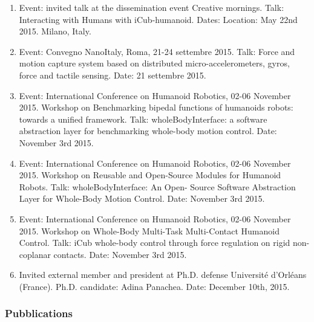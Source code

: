 \begin{enumerate}
\item Event: invited talk at the dissemination event Creative mornings. Talk: Interacting with Humans with iCub-humanoid. Dates: Location: May 22nd 2015. Milano, Italy.
\item  Event: Convegno NanoItaly, Roma, 21-24 settembre 2015. Talk: Force and motion capture system
based on distributed micro-accelerometers, gyros, force and tactile sensing. Date: 21 settembre 2015.
\item  Event: International Conference on Humanoid Robotics, 02-06 November 2015. Workshop on Benchmarking bipedal functions of humanoids robots: towards a unified framework. Talk: wholeBodyInterface: a software abstraction layer for benchmarking whole-body motion control. Date: November 3rd 2015.
\item  Event: International Conference on Humanoid Robotics, 02-06 November 2015. Workshop on Reusable and Open-Source Modules for Humanoid Robots. Talk: wholeBodyInterface: An Open- Source Software Abstraction Layer for Whole-Body Motion Control. Date: November 3rd 2015.
\item  Event: International Conference on Humanoid Robotics, 02-06 November 2015. Workshop on Whole-Body Multi-Task Multi-Contact Humanoid Control. Talk: iCub whole-body control through force regulation on rigid non-coplanar contacts. Date: November 3rd 2015.
\item  Invited external member and president at Ph.D. defense Université d'Orléans (France). Ph.D. candidate: Adina Panachea. Date: December 10th, 2015.
\end{enumerate}


\subsubsection{Pubblications}

